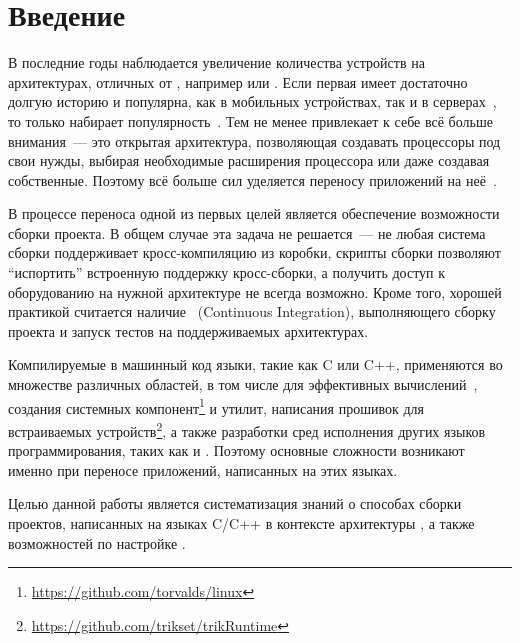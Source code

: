 
\section*{Введение}
\thispagestyle{withCompileDate}

В последние годы наблюдается увеличение количества устройств на архитектурах, отличных от \amd{}, например \arm{} или \riscv{}.
Если первая имеет достаточно долгую историю и популярна, как в мобильных устройствах, так и в серверах~\cite{aleksandarkChinaHosts402023}, то \riscv{} только набирает популярность~\cite{sperlingRISCVPushesMainstream2022}.
Тем не менее \riscv{} привлекает к себе всё больше внимания~--- это открытая архитектура, позволяющая создавать процессоры под свои нужды, выбирая необходимые расширения процессора или даже создавая собственные.
Поэтому всё больше сил уделяется переносу приложений на неё~\cite{ducassePortingJITCompiler2022,newsHowAlibabaPorting,mcgrewPortingNetBSDRISCV}.

В процессе переноса одной из первых целей является обеспечение возможности сборки проекта.
В общем случае эта задача не решается~--- не любая система сборки поддерживает кросс-компиляцию из коробки, скрипты сборки позволяют \enquote{испортить} встроенную поддержку кросс-сборки, а получить доступ к оборудованию на нужной архитектуре не всегда возможно.
Кроме того, хорошей практикой считается наличие \ci{}~(Continuous Integration), выполняющего сборку проекта и запуск тестов на поддерживаемых архитектурах.

Компилируемые в машинный код языки, такие как \textsc{C} или \textsc{C++}, применяются во множестве различных областей, в том числе для эффективных вычислений~\cite{davisAlgorithm1000SuiteSparse2019}, создания системных компонент\footnote{\url{https://github.com/torvalds/linux}} и утилит, написания прошивок для встраиваемых устройств\footnote{\url{https://github.com/trikset/trikRuntime}}, а также разработки сред исполнения других языков программирования, таких как \dotnet{} и \java{}.
Поэтому основные сложности возникают именно при переносе приложений, написанных на этих языках.

Целью данной работы является систематизация знаний о способах сборки проектов, написанных на языках \textsc{C}/\textsc{C++} в контексте архитектуры \riscv{}, а также возможностей по настройке \ci{}.
